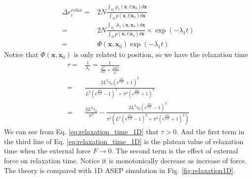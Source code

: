 \documentclass[12pt,a4paper]{article}
\begin{document}
\begin{equation}
    \label{eq:position_relaxation}
    \begin{aligned}
        \Delta r_i^{relax} = & 2N \frac{\int_{\Omega_i} p_1(\mathbf{x}, t|
            \mathbf{x}_0) d\mathbf{x}}{\int_{\Omega} p(\mathbf{x}, t |
            \mathbf{x}_0)d\mathbf{x}} \\
        = &  2N \frac{\int_{\Omega_i} A_1(\mathbf{x}, \mathbf{x}_0) d\mathbf{x}}
        {\int_{\Omega} p(\mathbf{x}, t |
            \mathbf{x}_0)d\mathbf{x}}\times\exp(-\lambda_1 t) \\
        = & \Phi(\mathbf{x}, \mathbf{x}_0) \exp(-\lambda_1 t)
    \end{aligned}
\end{equation}
Notice that $\Phi(\mathbf{x}, \mathbf{x}_0)$ is only related to position, so we
have the relaxation time 
\begin{equation}
    \label{eq:relaxation_time_1D}
    \begin{aligned}
        \tau = & \frac{1}{\lambda_1} = \frac{1}{\frac{\mu^2}{4D} +
        \frac{D\pi^2}{L^2}} \\
    = & \frac{2 L^2 \tau_{0} \left(e^{\frac{2 F a}{k_{B} T}} + 1\right)^2}
    {L^2 \left(e^{\frac{2 F a}{k_{B}T}} - 1\right)^2 +
        \pi^2 \left(e^{\frac{2 F a}{k_{B} T}} + 1\right)^2} \\
    = &\frac{2 L^2 \tau_{0}}{\pi^2} - \frac{2 L^4 \tau_{0} \left(e^{\frac{2 F
                    a}{k_{B} T}} - 1\right)^2} {\pi^2 \left(L^2 \left(e^{\frac{2
                        F a}{k_{B} T}} - 1\right)^2 + \pi^2 \left(e^{\frac{2 F
                        a}{k_{B} T}} + 1\right)^2\right)}
    \end{aligned}
\end{equation}
We can see from Eq. \eqref{eq:relaxation_time_1D} that $\tau>0$. And the first
term in the third line of Eq. \eqref{eq:relaxation_time_1D} is the plateau value
of relaxation time when the external force $F \rightarrow 0$. The second term is
the effect of external force on relaxation time. Notice it is monotonically
decrease as increase of force. The theory is compared with 1D ASEP simulation in
Fig. \ref{fig:relaxation1D}.
\end{document}
